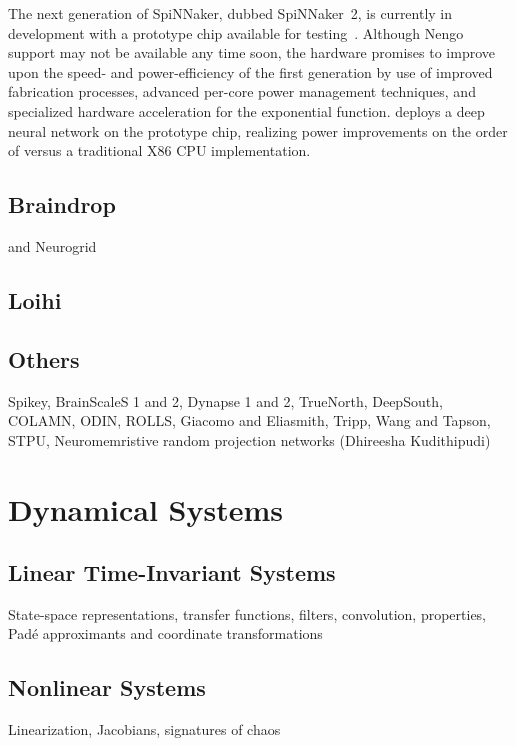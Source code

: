 The next generation of SpiNNaker, dubbed SpiNNaker~2, is currently in development with a prototype chip available for testing~\citep{liu2018memory}.
Although Nengo support may not be available any time soon, the hardware promises to improve upon the speed- and power-efficiency of the first generation by use of improved fabrication processes, advanced per-core power management techniques, and specialized hardware acceleration for the exponential function.
\citet{liu2018memory} deploys a deep neural network on the prototype chip, realizing power improvements on the order of  versus a traditional X86 CPU implementation.

\subsection{Braindrop}

and Neurogrid

\subsection{Loihi}

\subsection{Others}

Spikey, BrainScaleS 1 and 2, Dynapse 1 and 2, TrueNorth, DeepSouth, COLAMN, ODIN, ROLLS, Giacomo and Eliasmith, Tripp, Wang and Tapson, STPU, Neuromemristive random projection networks (Dhireesha Kudithipudi)


\section{Dynamical Systems}

\subsection{Linear Time-Invariant Systems}

State-space representations, transfer functions, filters, convolution, properties, Pad\'e approximants and coordinate transformations

\subsection{Nonlinear Systems}

Linearization, Jacobians, signatures of chaos


